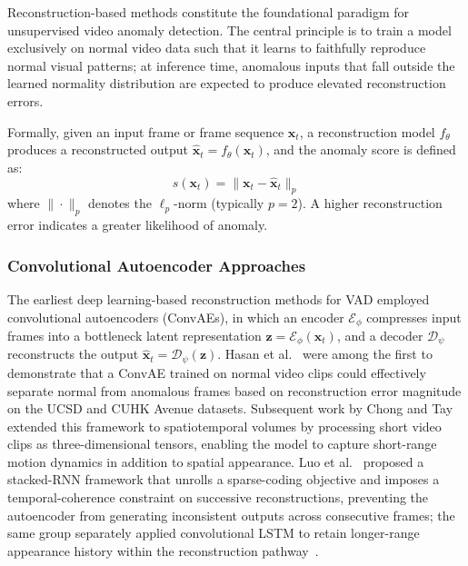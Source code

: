 \documentclass[10pt,a4paper]{article}
\begin{document}
Reconstruction-based methods constitute the foundational paradigm for unsupervised video anomaly detection. The central principle is to train a model exclusively on normal video data such that it learns to faithfully reproduce normal visual patterns; at inference time, anomalous inputs that fall outside the learned normality distribution are expected to produce elevated reconstruction errors.

Formally, given an input frame or frame sequence $\mathbf{x}_t$, a reconstruction model $f_\theta$ produces a reconstructed output $\hat{\mathbf{x}}_t = f_\theta(\mathbf{x}_t)$, and the anomaly score is defined as:
\begin{equation}
    s(\mathbf{x}_t) = \| \mathbf{x}_t - \hat{\mathbf{x}}_t \|_p
    \label{eq:recon_score}
\end{equation}
where $\|\cdot\|_p$ denotes the $\ell_p$-norm (typically $p=2$). A higher reconstruction error indicates a greater likelihood of anomaly.

\subsubsection{Convolutional Autoencoder Approaches}

The earliest deep learning-based reconstruction methods for VAD employed convolutional autoencoders (ConvAEs), in which an encoder $\mathcal{E}_\phi$ compresses input frames into a bottleneck latent representation $\mathbf{z} = \mathcal{E}_\phi(\mathbf{x}_t)$, and a decoder $\mathcal{D}_\psi$ reconstructs the output $\hat{\mathbf{x}}_t = \mathcal{D}_\psi(\mathbf{z})$. Hasan et al.~\citeyearpar{hasan2016learning} were among the first to demonstrate that a ConvAE trained on normal video clips could effectively separate normal from anomalous frames based on reconstruction error magnitude on the UCSD and CUHK Avenue datasets. Subsequent work by Chong and Tay~\citeyearpar{chong2017abnormal} extended this framework to spatiotemporal volumes by processing short video clips as three-dimensional tensors, enabling the model to capture short-range motion dynamics in addition to spatial appearance. Luo et al.~\citeyearpar{luo2017revisit} proposed a stacked-RNN framework that unrolls a sparse-coding objective and imposes a temporal-coherence constraint on successive reconstructions, preventing the autoencoder from generating inconsistent outputs across consecutive frames; the same group separately applied convolutional LSTM to retain longer-range appearance history within the reconstruction pathway~\citep{luo2017remembering}.
\end{document}
